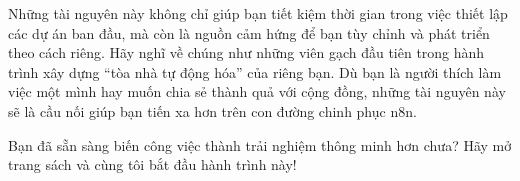 \documentclass[a4paper,12pt,oneside]{book}
\begin{document}
Những tài nguyên này không chỉ giúp bạn tiết kiệm thời gian trong việc thiết lập các dự án ban đầu, mà còn là nguồn cảm hứng để bạn tùy chỉnh và phát triển theo cách riêng. Hãy nghĩ về chúng như những viên gạch đầu tiên trong hành trình xây dựng “tòa nhà tự động hóa” của riêng bạn. Dù bạn là người thích làm việc một mình hay muốn chia sẻ thành quả với cộng đồng, những tài nguyên này sẽ là cầu nối giúp bạn tiến xa hơn trên con đường chinh phục n8n.

Bạn đã sẵn sàng biến công việc thành trải nghiệm thông minh hơn chưa? Hãy mở trang sách và cùng tôi bắt đầu hành trình này!





\tableofcontents























\end{document}
